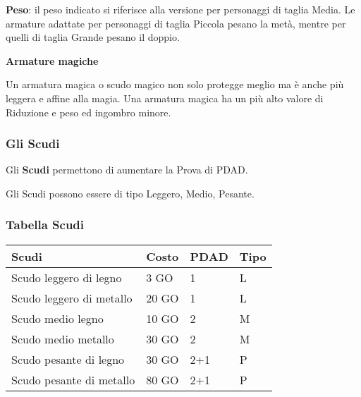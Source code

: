 \documentclass[12pt,a4paper,twoside,openany]{book}
\begin{document}
\begin{multicols}{2}
\textbf{Peso}: il peso indicato si riferisce alla versione per personaggi di taglia Media. Le armature adattate per personaggi di taglia Piccola pesano la metà, mentre per quelli di taglia Grande pesano il doppio.

\textbf{Armature magiche}

Un armatura magica o scudo magico non solo protegge meglio ma è anche più leggera e affine alla magia. Una armatura magica ha un più alto valore di Riduzione e peso ed ingombro minore.

\subsubsection{Gli Scudi}

Gli \textbf{Scudi} permettono di aumentare la Prova di PDAD. 

Gli Scudi possono essere di tipo Leggero, Medio, Pesante.

\end{multicols}

\subsubsection{Tabella Scudi}

\label{tabella-scudi}

\begin{center}
	\begin{tabular}{llll}
\textbf{Scudi} & \textbf{Costo} & \textbf{PDAD} & \textbf{Tipo}\\
\toprule
Scudo leggero di legno 		& 3 GO   &  1	& L\\
Scudo leggero di metallo 	& 20 GO  &  1 	& L\\
Scudo medio legno			& 10 GO  &  2	& M\\
Scudo medio metallo 		& 30 GO  &  2  	& M\\
Scudo pesante di legno 		& 30 GO  &  2+1 & P\\
Scudo pesante di metallo	& 80 GO  &  2+1 & P\\
\end{tabular}

\end{center}
\end{document}

